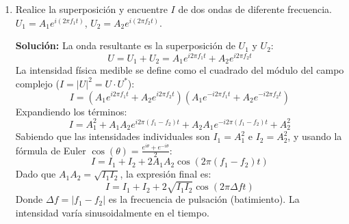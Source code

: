 \documentclass[12pt, letterpaper]{article}
\begin{document}
\begin{enumerate}
		La ecuación de intensidad para el $i$-ésimo paso es:
		$$ I_i(x,y) = I_0(x,y) + I_M(x,y) \cos[\phi(x,y) + \alpha_i] $$
		Al tener 3 incógnitas fundamentales ($I_0$ luz de fondo, $I_M$ modulación de amplitud y $\phi$ la fase), se necesitan al menos 3 pasos. Si, por ejemplo, utilizamos un algoritmo de 4 pasos con incrementos $\alpha = 0, \pi/2, \pi, 3\pi/2$, obtenemos 4 ecuaciones de intensidad $I_1, I_2, I_3, I_4$.
		
		Combinándolas matemáticamente para aislar $\phi(x,y)$, llegamos a la función arcotangente:
		$$ \phi(x,y) = \arctan\left( \frac{I_4 - I_2}{I_1 - I_3} \right) $$
		Esta ecuación nos proporciona la fase "envuelta" (wrapped) en el dominio $[-\pi, \pi]$, requiriendo posteriormente algoritmos de desenvolvimiento (unwrapping) para obtener la fase física continua.
		
		\item Realice la superposición y encuentre $I$ de dos ondas de diferente frecuencia. $U_{1}=A_{1}e^{i(2\pi f_{1}t)}$, $U_{2}=A_{2}e^{i(2\pi f_{2}t)}$. 
		
		\textbf{Solución:}
		La onda resultante es la superposición de $U_1$ y $U_2$:
		$$ U = U_1 + U_2 = A_1 e^{i 2\pi f_1 t} + A_2 e^{i 2\pi f_2 t} $$
		La intensidad física medible se define como el cuadrado del módulo del campo complejo ($I = |U|^2 = U \cdot U^*$):
		$$ I = (A_1 e^{i 2\pi f_1 t} + A_2 e^{i 2\pi f_2 t}) (A_1 e^{-i 2\pi f_1 t} + A_2 e^{-i 2\pi f_2 t}) $$
		Expandiendo los términos:
		$$ I = A_1^2 + A_1 A_2 e^{i 2\pi (f_1 - f_2) t} + A_2 A_1 e^{-i 2\pi (f_1 - f_2) t} + A_2^2 $$
		Sabiendo que las intensidades individuales son $I_1 = A_1^2$ e $I_2 = A_2^2$, y usando la fórmula de Euler $\cos(\theta) = \frac{e^{i\theta} + e^{-i\theta}}{2}$:
		$$ I = I_1 + I_2 + 2 A_1 A_2 \cos(2\pi (f_1 - f_2) t) $$
		Dado que $A_1 A_2 = \sqrt{I_1 I_2}$, la expresión final es:
		$$ I = I_1 + I_2 + 2\sqrt{I_1 I_2} \cos(2\pi \Delta f t) $$
		Donde $\Delta f = |f_1 - f_2|$ es la frecuencia de pulsación (batimiento). La intensidad varía sinusoidalmente en el tiempo.
		
	\end{enumerate}
	
\end{document}
